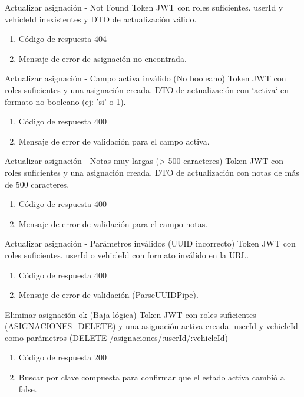 {Actualizar asignación - Not Found}
{Token JWT con roles suficientes.}
{userId y vehicleId inexistentes y DTO de actualización válido.}
{\begin{enumerate} [leftmargin=*, nosep]
    \item Código de respuesta 404
    \item Mensaje de error de asignación no encontrada.
\end{enumerate}}

{Actualizar asignación - Campo activa inválido (No booleano)}
{Token JWT con roles suficientes y una asignación creada.}
{DTO de actualización con `activa` en formato no booleano (ej: 'si' o 1).}
{\begin{enumerate} [leftmargin=*, nosep]
    \item Código de respuesta 400
    \item Mensaje de error de validación para el campo activa.
\end{enumerate}}

{Actualizar asignación - Notas muy largas (> 500 caracteres)}
{Token JWT con roles suficientes y una asignación creada.}
{DTO de actualización con notas de más de 500 caracteres.}
{\begin{enumerate} [leftmargin=*, nosep]
    \item Código de respuesta 400
    \item Mensaje de error de validación para el campo notas.
\end{enumerate}}

{Actualizar asignación - Parámetros inválidos (UUID incorrecto)}
{Token JWT con roles suficientes.}
{userId o vehicleId con formato inválido en la URL.}
{\begin{enumerate} [leftmargin=*, nosep]
    \item Código de respuesta 400
    \item Mensaje de error de validación (ParseUUIDPipe).
\end{enumerate}}

{Eliminar asignación ok (Baja lógica)}
{Token JWT con roles suficientes (ASIGNACIONES\_DELETE) y una asignación activa creada.}
{userId y vehicleId como parámetros (DELETE /asignaciones/:userId/:vehicleId)}
{\begin{enumerate} [leftmargin=*, nosep]
    \item Código de respuesta 200
    \item Buscar por clave compuesta para confirmar que el estado activa cambió a false.
\end{enumerate}}

